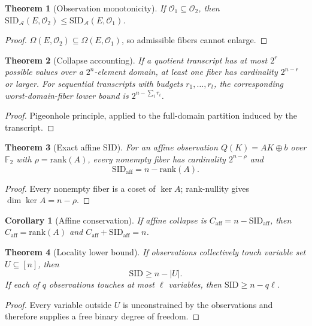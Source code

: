 \documentclass[11pt]{article}
\newtheorem{theorem}{Theorem}
\newtheorem{corollary}{Corollary}
\begin{document}
\begin{theorem}[Observation monotonicity]
If $\mathcal O_1\subseteq\mathcal O_2$, then $\mathrm{SID}_{\mathcal A}(E,\mathcal O_2)\le \mathrm{SID}_{\mathcal A}(E,\mathcal O_1)$.
\end{theorem}
\begin{proof} $\Omega(E,\mathcal O_2)\subseteq\Omega(E,\mathcal O_1)$, so admissible fibers cannot enlarge. \end{proof}

\begin{theorem}[Collapse accounting]
If a quotient transcript has at most $2^r$ possible values over a $2^n$-element domain, at least one fiber has cardinality $2^{n-r}$ or larger. For sequential transcripts with budgets $r_1,\ldots,r_t$, the corresponding worst-domain-fiber lower bound is $2^{n-\sum_i r_i}$.
\end{theorem}
\begin{proof} Pigeonhole principle, applied to the full-domain partition induced by the transcript. \end{proof}

\begin{theorem}[Exact affine SID]
For an affine observation $Q(K)=AK\oplus b$ over $\mathbb F_2$ with $\rho=\mathrm{rank}(A)$, every nonempty fiber has cardinality $2^{n-\rho}$ and
\[
\boxed{\mathrm{SID}_{\mathrm{aff}}=n-\mathrm{rank}(A)}.
\]
\end{theorem}
\begin{proof} Every nonempty fiber is a coset of $\ker A$; rank-nullity gives $\dim\ker A=n-\rho$. \end{proof}

\begin{corollary}[Affine conservation]
If affine collapse is $C_{\mathrm{aff}}=n-\mathrm{SID}_{\mathrm{aff}}$, then $C_{\mathrm{aff}}=\mathrm{rank}(A)$ and $C_{\mathrm{aff}}+\mathrm{SID}_{\mathrm{aff}}=n$.
\end{corollary}

\begin{theorem}[Locality lower bound]
If observations collectively touch variable set $U\subseteq[n]$, then
\[
\mathrm{SID}\ge n-|U|.
\]
If each of $q$ observations touches at most $\ell$ variables, then $\mathrm{SID}\ge n-q\ell$.
\end{theorem}
\begin{proof} Every variable outside $U$ is unconstrained by the observations and therefore supplies a free binary degree of freedom. \end{proof}
\end{document}
